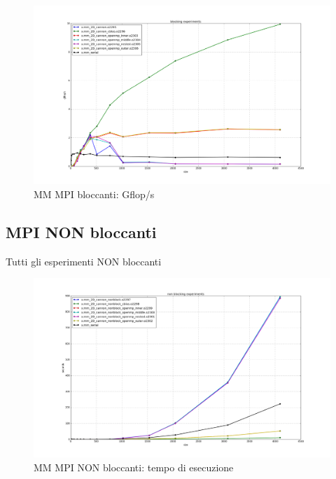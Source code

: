 \begin{figure}[htbp]
    \begin{center}
        \includegraphics[width=15cm]{immagini/blocking_gflops.png}
    \end{center}
    \caption{MM MPI bloccanti: Gflop/s}
    \label{fig:blocking_gflops}
\end{figure}

\subsection{MPI NON bloccanti}

Tutti gli esperimenti NON bloccanti

\begin{figure}[htbp]
    \begin{center}
        \includegraphics[width=15cm]{immagini/non_blocking_times.png}
    \end{center}
    \caption{MM MPI NON bloccanti: tempo di esecuzione}
    \label{fig:non_blocking_times}
\end{figure}

